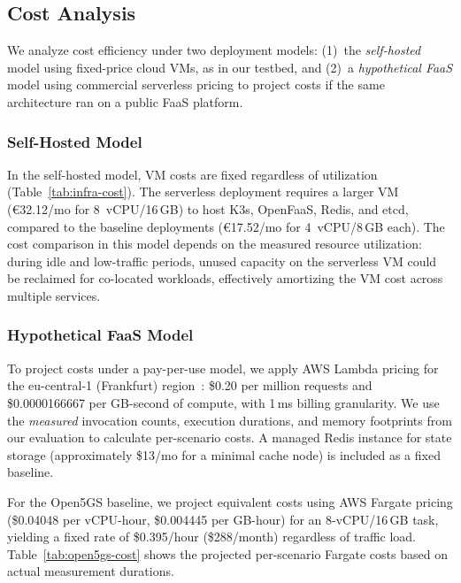 \documentclass[conference]{IEEEtran}
\begin{document}
\subsection{Cost Analysis}

We analyze cost efficiency under two deployment models: (1)~the \textit{self-hosted} model using fixed-price cloud VMs, as in our testbed, and (2)~a \textit{hypothetical FaaS} model using commercial serverless pricing to project costs if the same architecture ran on a public FaaS platform.

\subsubsection{Self-Hosted Model}

In the self-hosted model, VM costs are fixed regardless of utilization (Table~\ref{tab:infra-cost}). The serverless deployment requires a larger VM (\euro32.12/mo for 8~vCPU/16\,GB) to host K3s, OpenFaaS, Redis, and etcd, compared to the baseline deployments (\euro17.52/mo for 4~vCPU/8\,GB each). The cost comparison in this model depends on the measured resource utilization: during idle and low-traffic periods, unused capacity on the serverless VM could be reclaimed for co-located workloads, effectively amortizing the VM cost across multiple services.

\subsubsection{Hypothetical FaaS Model}

To project costs under a pay-per-use model, we apply AWS Lambda pricing for the eu-central-1 (Frankfurt) region~\cite{aws-lambda-pricing}: \$0.20 per million requests and \$0.0000166667 per GB-second of compute, with 1\,ms billing granularity. We use the \textit{measured} invocation counts, execution durations, and memory footprints from our evaluation to calculate per-scenario costs. A managed Redis instance for state storage (approximately \$13/mo for a minimal cache node) is included as a fixed baseline.

For the Open5GS baseline, we project equivalent costs using AWS Fargate pricing (\$0.04048 per vCPU-hour, \$0.004445 per GB-hour) for an 8-vCPU/16\,GB task, yielding a fixed rate of \$0.395/hour (\$288/month) regardless of traffic load. Table~\ref{tab:open5gs-cost} shows the projected per-scenario Fargate costs based on actual measurement durations.
\end{document}
